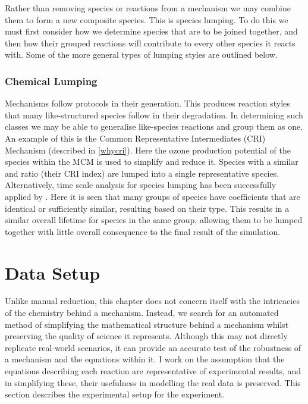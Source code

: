 Rather than removing species or reactions from a mechanism we may combine them to form a new composite species. This is species lumping. To do this we must first consider how we determine species that are to be joined together, and then how their grouped reactions will contribute to every other species it reacts with. Some of the more general types of lumping styles are outlined below. 


\subsubsection{Chemical Lumping}\label{sec:chemlump}
Mechanisms follow protocols in their generation. This produces reaction styles that many like-structured species follow in their degradation. In determining such classes we may be able to generalise like-species reactions and group them as one.
An example of this is the Common Representative Intermediates (CRI) Mechanism (described in \autoref{whycri}).  Here the ozone production potential of the species within the MCM is used to simplify and reduce it. Species with a similar  and  ratio (their CRI index) are lumped into a single representative species. Alternatively, time scale analysis for species lumping has been successfully applied by  \cite{lifetime}. Here it is seen that many groups of species have coefficients that are identical or sufficiently similar, resulting based on their type. This results in a similar overall lifetime for species in the same group, allowing them to be lumped together with little overall consequence to the final result of the simulation. 


\section{Data Setup}
Unlike manual reduction, this chapter does not concern itself with the intricacies of the chemistry behind a mechanism. Instead, we search for an automated method of simplifying the mathematical structure behind a mechanism whilst preserving the quality of science it represents. Although this may not directly replicate real-world scenarios, it can provide an accurate test of the robustness of a mechanism and the equations within it. I work on the assumption that the equations describing each reaction are representative of experimental results, and in simplifying these, their usefulness in modelling the real data is preserved. This section describes the experimental setup for the experiment.


